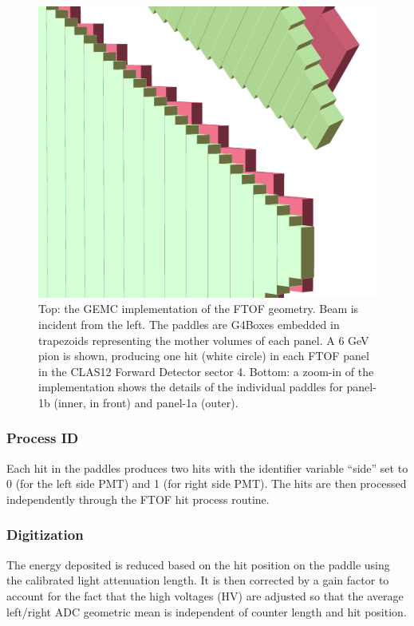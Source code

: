 \begin{figure}
	\includegraphics[width=0.99\columnwidth,keepaspectratio]{img/ftofDetail.png}
	\caption{Top: the GEMC implementation of the FTOF geometry. Beam is incident from the left.
             The paddles are G4Boxes embedded in trapezoids
             representing the mother volumes of each panel. A 6 GeV pion is shown, producing one hit (white circle) in each FTOF panel
             in the CLAS12 Forward Detector sector 4.
             Bottom: a zoom-in of the implementation shows the details of the individual paddles for panel-1b (inner,
             in front) and panel-1a (outer). }
	\label{fig:ftofGeometry}
\end{figure}

\subsubsection{Process ID}

Each hit in the paddles produces two hits with the identifier variable ``side'' set to 0
(for the left side PMT) and 1 (for right side PMT).
The hits are then processed independently through the FTOF hit process routine.

\subsubsection{Digitization}

The energy deposited is reduced based on the hit position on the paddle using the calibrated light attenuation length.
It is then corrected by a gain factor to account for the fact that the high voltages (HV) are adjusted so that
the average left/right ADC geometric mean is independent of counter length and hit position.


